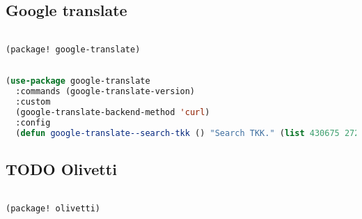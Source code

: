 \documentclass[11pt]{article}
\begin{document}
\subsection{Google translate}
\label{sec:google-translate}
\begin{lstlisting}[language=Lisp]%! Someone please complete this list for me

(package! google-translate)
\end{lstlisting}

\begin{lstlisting}[language=Lisp]%! Someone please complete this list for me

(use-package google-translate
  :commands (google-translate-version)
  :custom
  (google-translate-backend-method 'curl)
  :config
  (defun google-translate--search-tkk () "Search TKK." (list 430675 2721866130)))
\end{lstlisting}

\subsection{{\bfseries\sffamily TODO} Olivetti}
\label{sec:olivetti}
\begin{lstlisting}[language=Lisp]%! Someone please complete this list for me

(package! olivetti)
\end{lstlisting}
\end{document}
